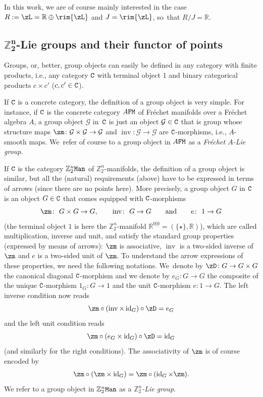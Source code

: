 \documentclass[pdftex]{sigma}%
\newcommand{\op}[1]{\operatorname{#1}}
\newcommand{\R}{{\mathbb R}}
\newcommand{\Z}{{\mathbb Z}}
\def\ul{\underline}
\def\ul{\underline}
\newcommand{\0}{\otimes}
\newcommand{\id}{\op{id}}
\newcommand{\z}{\Z_2^n}
\numberwithin{equation}{section}
\begin{document}
In this work, we are of course mainly interested in the case $R:=\zL=\R\oplus\rim{\zL}$ and $J=\rim{\zL}$, so~that $R/J=\R$.

\subsection[Z2n-Lie groups and their functor of points]
{$\boldsymbol{\Z_2^n}$-Lie groups and their functor of points}

Groups, or, better, group objects can easily be defined in any category with finite products, i.e., any category $\tt C$ with terminal object $1$ and binary categorical products $c\times c'$ ($c,c'\in {\tt C}$).

\newcommand{\cG}{\mathcal{G}}

If $\tt C$ is a concrete category, the definition of a group object is very simple. For instance, if $\tt C$ is the concrete category $A\tt FM$ of Fr\'echet manifolds over a Fr\'echet algebra $A$, a group object $\cG$ in~$\tt C$ is just an object $\cG\in\tt C$ that is group whose structure maps $\zm\colon \cG\times \cG\to \cG$ and $\op{inv}\colon \cG\to \cG$ are $\tt C$-morphisms, i.e., $A$-smooth maps. We~refer of course to a group object in $A\tt FM$ as a {\it Fr\'echet $A$-Lie group}.

If $\tt C$ is the category $\z\tt Man$ of $\z$-manifolds, the definition of a group object is similar, but all the (natural) requirements (above) have to be expressed in terms of arrows (since there are no points here). More precisely, a group object $G$ in $\tt C$ is an object $G\in\tt C$ that comes equipped with $\tt C$-morphisms
\[
\zm\colon\ G\times G\to G,\qquad \op{inv}\colon\ G\to G\qquad\text{and}\qquad e\colon\ 1\to G
\]
(the terminal object $1$ is here the $\z$-manifold $\R^{0|\ul 0}=(\{\star\},\R)$), which are called multiplication, inverse and unit, and satisfy the standard group properties (expressed by means of arrows): $\zm$ is associative, $\op{inv}$ is a two-sided inverse of $\zm$ and $e$ is a two-sided unit of $\zm$. To understand the arrow expressions of these properties, we need the following notations. We~denote by $\zD\colon G\to G\times G$ the canonical diagonal $\tt C$-morphism and we denote by $e_G\colon G\to G$ the composite of the unique $\tt C$-morphism $1_G\colon G\to 1$ and the unit $\tt C$-morphism $e\colon 1\to G$. The left inverse condition now reads
\[
\zm\circ(\op{inv}\times\id_G)\circ \zD=e_G
\]
and the left unit condition reads
\[
\zm\circ (e_G\times\id_G)\circ\zD =\id_G
\]
(and similarly for the right conditions). The associativity of $\zm$ is of course encoded by \begin{gather}\label{AssG}
\zm\circ(\zm\times \id_G)=\zm\circ(\id_G\times\zm).
\end{gather}
We refer to a group object in $\z\tt Man$ as a {\it $\z$-Lie group}.
\end{document}
